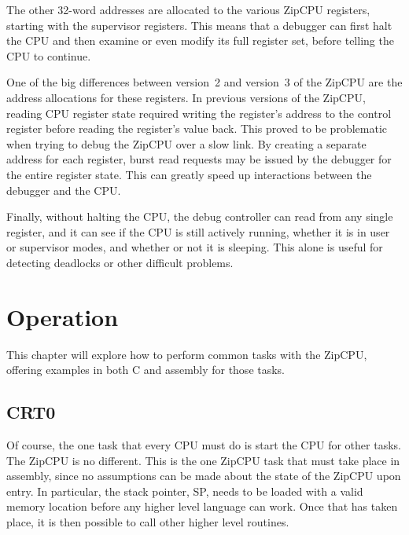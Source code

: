 \documentclass{gqtekspec}
\begin{document}
The other 32-word addresses are allocated to the various ZipCPU registers,
starting with the supervisor registers.  This means that a debugger can first
halt the CPU and then examine or even modify its full register set, before
telling the CPU to continue.

One of the big differences between version~2 and version~3 of the ZipCPU
are the address allocations for these registers.  In previous versions of
the ZipCPU, reading CPU register state required writing the register's
address to the control register before reading the register's value back.
This proved to be problematic when trying to debug the ZipCPU over a slow
link.  By creating a separate address for each register, burst read requests
may be issued by the debugger for the entire register state.  This can
greatly speed up interactions between the debugger and the CPU.

Finally, without halting the CPU, the debug controller can read from any
single register, and it can see if the CPU is still actively running, whether
it is in user or supervisor modes, and whether or not it is sleeping.  This
alone is useful for detecting deadlocks or other difficult problems.
\chapter{Operation}\label{chap:ops}
This chapter will explore how to perform common tasks with the ZipCPU,
offering examples in both C and assembly for those tasks.

\section{CRT0}
Of course, the one task that every CPU must do is start the CPU for other
tasks.  The ZipCPU is no different.  This is the one ZipCPU task that must
take place in assembly, since no assumptions can be made about the state of
the ZipCPU upon entry.  In particular, the stack pointer, SP, needs to be
loaded with a valid memory location before any higher level language can work.
Once that has taken place, it is then possible to call other higher level
routines.
\end{document}
